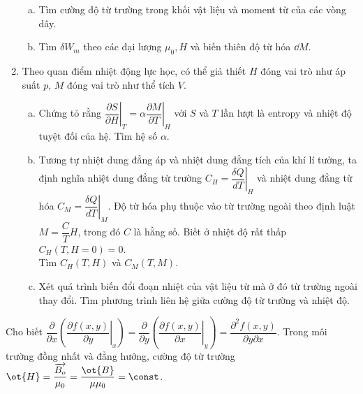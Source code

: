 \begin{vd}
\begin{enumerate}[1)]
\begin{center}
        \end{center}
        \begin{enumerate}[a)]
            \item Tìm cường độ từ trường trong khối vật liệu và moment từ của các vòng dây.
            \item Tìm $\delta {{{W}}_{{m}}}$ theo các đại lượng ${{\mu }_{0}},{H}$ và biến thiên độ từ hóa ${\dd M}$.
        \end{enumerate}
        \item Theo quan điểm nhiệt động lực học, có thể giả thiết $H$ đóng vai trò như áp suất $p$, $M$ đóng vai trò như thể tích $V$.
        \begin{enumerate}[a)]
            \item Chứng tỏ rằng ${{\left. \dfrac{\partial S}{\partial {H}} \right|}_{{T}}}=\alpha \left. \dfrac{\partial {M}}{\partial {T}} \right|_{H}$ với $S$ và $T$ lần lượt là entropy và nhiệt độ tuyệt đối của hệ. Tìm hệ số $\alpha $.
            \item Tương tự nhiệt dung đẳng áp và nhiệt dung đẳng tích của khí lí tưởng, ta định nghĩa nhiệt dung đẳng từ trường ${{{C}}_{{H}}}={{\left. \dfrac{\delta {Q}}{{dT}} \right|}_{{H}}}$ và nhiệt dung đẳng từ hóa ${{{C}}_{{M}}}={{\left. \dfrac{\delta {Q}}{{dT}} \right|}_{{M}}}$. Độ từ hóa phụ thuộc vào từ trường ngoài theo định luật ${M}=\dfrac{{C}}{{T}}{H}$, trong đó ${C}$ là hằng số. Biết ở nhiệt độ rất thấp ${{{C}}_{{H}}}({T},{H}=0)=0$.
            \\Tìm ${{C}_{{H}}}({T},{H})$ và ${{{C}}_{{M}}}({T},{M})$.
            \item Xét quá trình biến đổi đoạn nhiệt của vật liệu từ mà ở đó từ trường ngoài thay đổi. Tìm phương trình liên hệ giữa cường độ từ trường và nhiệt độ.
        \end{enumerate}
    \end{enumerate}
    Cho biết $\dfrac{\partial }{\partial x}\left( \left. \dfrac{\partial f(x,y)}{\partial y}\right|_x \right)=\dfrac{\partial }{\partial y}\left( \left. \dfrac{\partial f(x,y)}{\partial x}\right|_y \right)=\dfrac{{{\partial }^{2}}f(x,y)}{\partial y\partial x}$. 
    Trong môi trường đồng nhất và đẳng hướng, cường độ từ trường $\ot {H}=\dfrac{\overrightarrow{{{B}_{o}}}}{{{\mu }_{0}}}=\dfrac{{\ot{B}}}{\mu {{\mu }_{0}}}= \const$.
\end{vd}
